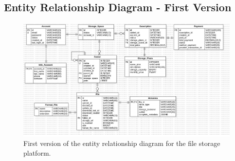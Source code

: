 \subsection{Entity Relationship Diagram - First Version}
\begin{figure}[H]
    \centering
    \includegraphics[width=\linewidth,height=0.95\textheight,keepaspectratio]{initialdbarch/ER.cloud.jpg}
    \caption{ First version of the entity relationship diagram for the file storage platform.}
    \label{fig:Entity Relaction}
\end{figure}
